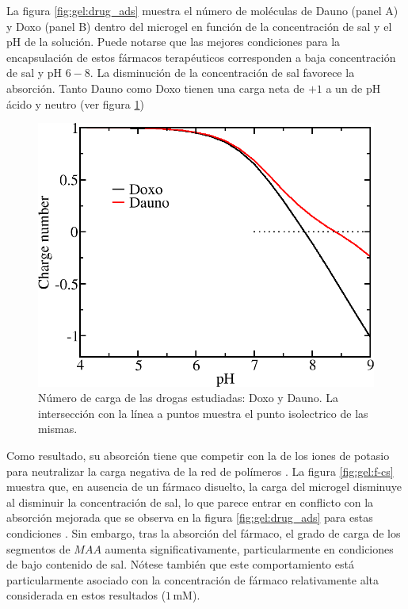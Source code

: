 La figura \ref{fig:gel:drug_ads} muestra el n\'umero de mol\'eculas de Dauno (panel A) y Doxo (panel B) dentro del microgel en funci\'on de la concentraci\'on de sal y el pH de la soluci\'on.
Puede notarse que las mejores condiciones para la encapsulaci\'on de estos f\'armacos terap\'euticos corresponden a baja concentraci\'on de sal y pH $6-8$.
La disminuci\'on de la concentraci\'on de sal favorece la absorci\'on.
Tanto Dauno como Doxo tienen una carga neta de $+1$ a un  de pH \'acido y neutro (ver figura \ref{fig:gel:carga-drug_ads})


\begin{figure}[!tb]
	\centering
	\includegraphics[width=0.9\linewidth]{Figures/graph-gel/drugs-Q.png}
	\caption{N\'umero de carga de las drogas estudiadas: Doxo y Dauno. La intersecci\'on con la l\'inea a puntos muestra el punto isolectrico de las mismas.}
	\label{fig:gel:carga-drug_ads}
\end{figure}




Como resultado, su absorci\'on tiene que competir con la de los iones de potasio para neutralizar la carga negativa de la red de pol\'imeros \cite{PerezChavez2020}.
La figura \ref{fig:gel:f-cs} muestra que, en ausencia de un f\'armaco disuelto, la carga del microgel disminuye al disminuir la concentraci\'on de sal, lo que parece entrar en conflicto con la absorci\'on mejorada que se observa en la figura \ref{fig:gel:drug_ads} para estas condiciones .
Sin embargo, tras la absorci\'on del f\'armaco, el grado de carga de los segmentos de $MAA$ aumenta significativamente, particularmente en condiciones de bajo contenido de sal. %
N\'otese tambi\'en que este comportamiento est\'a particularmente asociado con la concentraci\'on de f\'armaco relativamente alta considerada en estos resultados ($1\,$mM).

